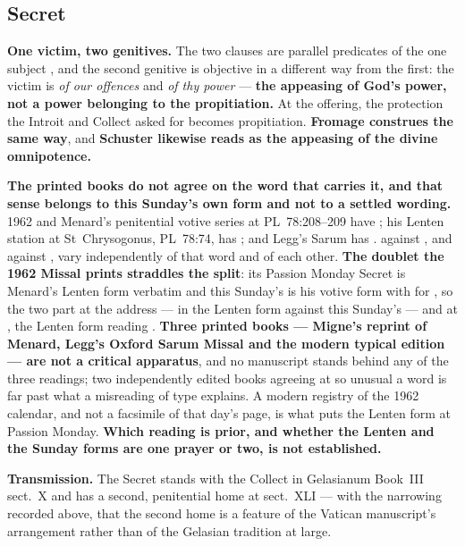 \elementguard
\subsection*{Secret }


\textbf{One victim, two genitives.} The two  clauses are parallel
predicates of the one subject , and the second
genitive is objective in a different way from the first: the victim is
 \emph{of our offences} and  \emph{of thy
power} --- \textbf{the appeasing of God's power, not a power belonging to the
propitiation.} At the offering, the protection the Introit and Collect asked for
becomes propitiation. \textbf{Fromage construes 
the same way}, and \textbf{Schuster likewise reads  as the appeasing of the divine omnipotence.}

\textbf{The printed books do not agree on the word that carries it, and that
sense belongs to this Sunday's own form and not to a settled wording.} 1962 and Menard's penitential votive series at PL~78:208--209 have
; his Lenten station at St~Chrysogonus, PL~78:74, has
; and Legg's Sarum has . 
against , and  against ,
vary independently of that word and of each other. \textbf{The doublet the 1962 Missal
prints straddles the split}: its Passion Monday Secret is Menard's Lenten form
verbatim and this Sunday's is his votive form with  for
, so the two part at the address ---  in the Lenten form against this Sunday's  ---
and at , the Lenten form reading . \textbf{Three printed books --- Migne's
reprint of Menard, Legg's Oxford Sarum Missal and the modern typical
edition --- are not a critical apparatus}, and no manuscript stands behind any
of the three readings; two independently edited books agreeing at so unusual a
word is far past what a misreading of type explains. A modern registry of the
1962 calendar, and not a facsimile of that day's page, is what puts the Lenten
form at Passion Monday. \textbf{Which reading is prior, and whether the Lenten and the
Sunday forms are one prayer or two, is not established.}

\textbf{Transmission.} The Secret stands with the Collect in Gelasianum
Book~III sect.~X and has a second, penitential home at sect.~XLI --- with the
narrowing recorded above, that the second home is a feature of the Vatican
manuscript's arrangement rather than of the Gelasian tradition at large.

